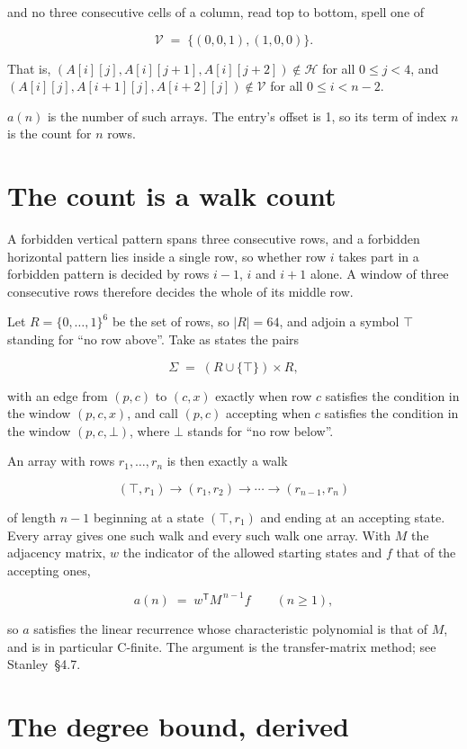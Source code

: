 \documentclass[11pt]{article}
\theoremstyle{definition}
\begin{document}
and no three consecutive cells of a column, read top to bottom, spell one of

\[\mathcal{V} \;=\; \{(0,0,1), (1,0,0)\}.\]

That is, $(A[i][j],A[i][j{+}1],A[i][j{+}2]) \notin \mathcal{H}$ for all $0 \le j < 4$, and $(A[i][j],A[i{+}1][j],A[i{+}2][j]) \notin \mathcal{V}$ for all $0 \le i < n-2$.

$a(n)$ is the number of such arrays. The entry's offset is 1, so its term of index $n$ is the count for $n$ rows.

\section{The count is a walk count}

A forbidden vertical pattern spans three consecutive rows, and a forbidden horizontal pattern lies inside a single row, so whether row $i$ takes part in a forbidden pattern is decided by rows $i-1$, $i$ and $i+1$ alone. A window of three consecutive rows therefore decides the whole of its middle row.

Let $R = \{0,\dots,1\}^{6}$ be the set of rows, so $|R| = 64$, and adjoin a symbol $\top$ standing for ``no row above''. Take as states the pairs

\[\Sigma \;=\; (R \cup \{\top\}) \times R,\]

with an edge from $(p,c)$ to $(c,x)$ exactly when row $c$ satisfies the condition in the window $(p,c,x)$, and call $(p,c)$ accepting when $c$ satisfies the condition in the window $(p,c,\bot)$, where $\bot$ stands for ``no row below''.

An array with rows $r_1,\dots,r_n$ is then exactly a walk

\[(\top,r_1) \to (r_1,r_2) \to \cdots \to (r_{n-1},r_n)\]

of length $n-1$ beginning at a state $(\top,r_1)$ and ending at an accepting state. Every array gives one such walk and every such walk one array. With $M$ the adjacency matrix, $w$ the indicator of the allowed starting states and $f$ that of the accepting ones,

\[a(n) \;=\; w^{\mathsf T} M^{\,n-1} f \qquad (n \ge 1),\]

so $a$ satisfies the linear recurrence whose characteristic polynomial is that of $M$, and is in particular C-finite. The argument is the transfer-matrix method; see Stanley~\S4.7.

\section{The degree bound, derived}
\end{document}
